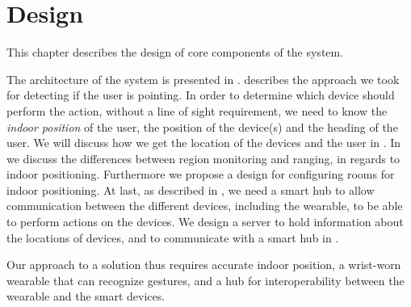 \chapter{Design}\label{chap:design}

This chapter describes the design of core components of the system.

The architecture of the system is presented in .
 describes the approach we took for detecting if the user is pointing.
In order to determine which device should perform the action, 
without a line of sight requirement, 
we need to know the \emph{indoor position} of the user, 
the position of the device(s) and the heading of the user. 
We will discuss how we get the location of the devices and the user in .
In  we discuss the differences between region monitoring and ranging, 
in regards to indoor positioning. 
Furthermore we propose a design for configuring rooms for indoor positioning.
At last, as described in , 
we need a smart hub to allow communication between the different devices, 
including the wearable, to be able to perform actions on the devices. 
We design a server to hold information about the locations of devices,
and to communicate with a smart hub in . 

Our approach to a solution thus requires accurate indoor position, 
a wrist-worn wearable that can recognize gestures, 
and a hub for interoperability between the wearable and the smart devices. 









